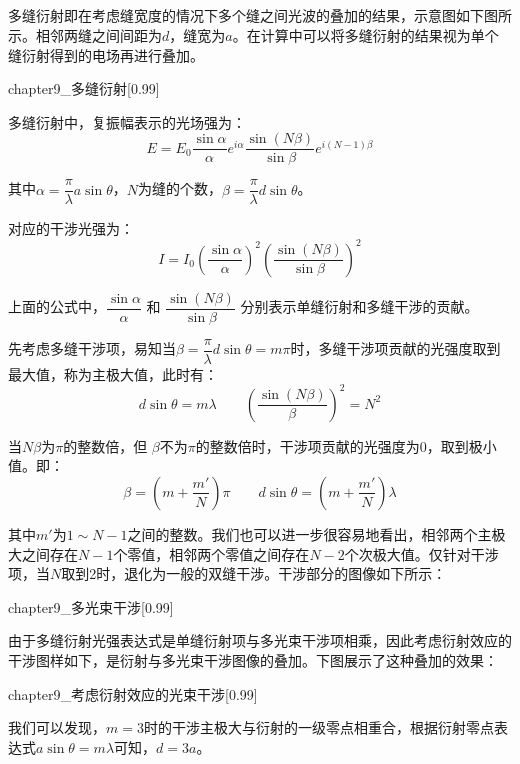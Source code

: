 \subsection[双缝干涉与衍射的结合]{}
多缝衍射即在考虑缝宽度的情况下多个缝之间光波的叠加的结果，示意图如下图所示。相邻两缝之间间距为$d$，缝宽为$a$。在计算中可以将多缝衍射的结果视为单个缝衍射得到的电场再进行叠加。
\begin{singlefigure}[多缝衍射]{chapter9_多缝衍射}[0.99]
\end{singlefigure}
\begin{law}
    多缝衍射中，复振幅表示的光场强为：
    \[E = E_0\dfrac{\sin\alpha}{\alpha}e^{i\alpha}\dfrac{\sin(N\beta)}{\sin\beta}e^{i(N-1)\beta}\]

    其中$\alpha = \dfrac{\pi}{\lambda}a\sin \theta$，$N$为缝的个数，$\beta = \dfrac{\pi}{\lambda}d\sin \theta$。

    对应的干涉光强为：
    \[I = I_0\left(\dfrac{\sin\alpha}{\alpha}\right)^2\left(\dfrac{\sin(N\beta)}{\sin\beta}\right)^2\]
\end{law}
上面的公式中，$\dfrac{\sin\alpha}{\alpha}$ 和 $\dfrac{\sin(N\beta)}{\sin\beta}$ 分别表示单缝衍射和多缝干涉的贡献。

先考虑多缝干涉项，易知当$\beta = \dfrac{\pi}{\lambda}d\sin \theta = m\pi$时，多缝干涉项贡献的光强度取到最大值，称为主极大值，此时有：
\[d\sin\theta = m\lambda\qquad \left(\dfrac{\sin(N\beta)}{\beta}\right)^2 = N^2\]

当$N\beta$为$\pi$的整数倍，但 $\beta$不为$\pi$的整数倍时，干涉项贡献的光强度为0，取到极小值。即：
\[\beta = (m+\dfrac{m'}{N})\pi\qquad d\sin\theta = (m + \dfrac{m'}{N})\lambda\]

其中$m'$为$1 \sim N-1$之间的整数。我们也可以进一步很容易地看出，相邻两个主极大之间存在$N-1$个零值，相邻两个零值之间存在$N-2$个次极大值。仅针对干涉项，当$N$取到2时，退化为一般的双缝干涉。干涉部分的图像如下所示：
\begin{singlefigure}[多光束干涉，N=4]{chapter9_多光束干涉}[0.99]
\end{singlefigure}

由于多缝衍射光强表达式是单缝衍射项与多光束干涉项相乘，因此考虑衍射效应的干涉图样如下，是衍射与多光束干涉图像的叠加。下图展示了这种叠加的效果：
\begin{singlefigure}[考虑衍射效应的光束干涉，d=3a]{chapter9_考虑衍射效应的光束干涉}[0.99]
\end{singlefigure}
我们可以发现，$m=3$时的干涉主极大与衍射的一级零点相重合，根据衍射零点表达式$a\sin \theta = m\lambda$可知，$d = 3a$。

